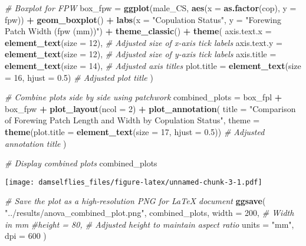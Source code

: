 \documentclass[
]{article}
\newenvironment{Shaded}{\begin{snugshade}}{\end{snugshade}}
\newcommand{\AttributeTok}[1]{\textcolor[rgb]{0.13,0.29,0.53}{#1}}
\newcommand{\CommentTok}[1]{\textcolor[rgb]{0.56,0.35,0.01}{\textit{#1}}}
\newcommand{\DecValTok}[1]{\textcolor[rgb]{0.00,0.00,0.81}{#1}}
\newcommand{\FloatTok}[1]{\textcolor[rgb]{0.00,0.00,0.81}{#1}}
\newcommand{\FunctionTok}[1]{\textcolor[rgb]{0.13,0.29,0.53}{\textbf{#1}}}
\newcommand{\NormalTok}[1]{#1}
\newcommand{\OtherTok}[1]{\textcolor[rgb]{0.56,0.35,0.01}{#1}}
\newcommand{\SpecialCharTok}[1]{\textcolor[rgb]{0.81,0.36,0.00}{\textbf{#1}}}
\newcommand{\StringTok}[1]{\textcolor[rgb]{0.31,0.60,0.02}{#1}}
\begin{document}
\begin{Shaded}
\begin{Highlighting}[]
\CommentTok{\# Boxplot for FPW}
\NormalTok{box\_fpw }\OtherTok{=} \FunctionTok{ggplot}\NormalTok{(male\_CS, }\FunctionTok{aes}\NormalTok{(}\AttributeTok{x =} \FunctionTok{as.factor}\NormalTok{(cop), }\AttributeTok{y =}\NormalTok{ fpw)) }\SpecialCharTok{+}
  \FunctionTok{geom\_boxplot}\NormalTok{() }\SpecialCharTok{+}
  \FunctionTok{labs}\NormalTok{(}\AttributeTok{x =} \StringTok{"Copulation Status"}\NormalTok{, }\AttributeTok{y =} \StringTok{"Forewing Patch Width (fpw (mm))"}\NormalTok{) }\SpecialCharTok{+}
  \FunctionTok{theme\_classic}\NormalTok{() }\SpecialCharTok{+}
  \FunctionTok{theme}\NormalTok{(}
    \AttributeTok{axis.text.x =} \FunctionTok{element\_text}\NormalTok{(}\AttributeTok{size =} \DecValTok{12}\NormalTok{),  }\CommentTok{\# Adjusted size of x{-}axis tick labels}
    \AttributeTok{axis.text.y =} \FunctionTok{element\_text}\NormalTok{(}\AttributeTok{size =} \DecValTok{12}\NormalTok{),  }\CommentTok{\# Adjusted size of y{-}axis tick labels}
    \AttributeTok{axis.title =} \FunctionTok{element\_text}\NormalTok{(}\AttributeTok{size =} \DecValTok{14}\NormalTok{),   }\CommentTok{\# Adjusted axis titles}
    \AttributeTok{plot.title =} \FunctionTok{element\_text}\NormalTok{(}\AttributeTok{size =} \DecValTok{16}\NormalTok{, }\AttributeTok{hjust =} \FloatTok{0.5}\NormalTok{)  }\CommentTok{\# Adjusted plot title}
\NormalTok{  )}

\CommentTok{\# Combine plots side by side using patchwork}
\NormalTok{combined\_plots }\OtherTok{=}\NormalTok{ box\_fpl }\SpecialCharTok{+}\NormalTok{ box\_fpw }\SpecialCharTok{+} \FunctionTok{plot\_layout}\NormalTok{(}\AttributeTok{ncol =} \DecValTok{2}\NormalTok{) }\SpecialCharTok{+}
  \FunctionTok{plot\_annotation}\NormalTok{(}
    \AttributeTok{title =} \StringTok{"Comparison of Forewing Patch Length and Width by Copulation Status"}\NormalTok{, }
    \AttributeTok{theme =} \FunctionTok{theme}\NormalTok{(}\AttributeTok{plot.title =} \FunctionTok{element\_text}\NormalTok{(}\AttributeTok{size =} \DecValTok{17}\NormalTok{, }\AttributeTok{hjust =} \FloatTok{0.5}\NormalTok{))  }\CommentTok{\# Adjusted annotation title}
\NormalTok{  )}

\CommentTok{\# Display combined plots}
\NormalTok{combined\_plots}
\end{Highlighting}
\end{Shaded}

\texttt{[image: damselflies\_files/figure-latex/unnamed-chunk-3-1.pdf]}

\begin{Shaded}
\begin{Highlighting}[]
\CommentTok{\# Save the plot as a high{-}resolution PNG for LaTeX document}
\FunctionTok{ggsave}\NormalTok{(}
  \StringTok{"../results/anova\_combined\_plot.png"}\NormalTok{, }
\NormalTok{  combined\_plots, }
  \AttributeTok{width =} \DecValTok{200}\NormalTok{,  }\CommentTok{\# Width in mm}
  \CommentTok{\#height = 80,  \# Adjusted height to maintain aspect ratio}
  \AttributeTok{units =} \StringTok{"mm"}\NormalTok{, }
  \AttributeTok{dpi =} \DecValTok{600}
\NormalTok{)}
\end{Highlighting}
\end{Shaded}
\end{document}
